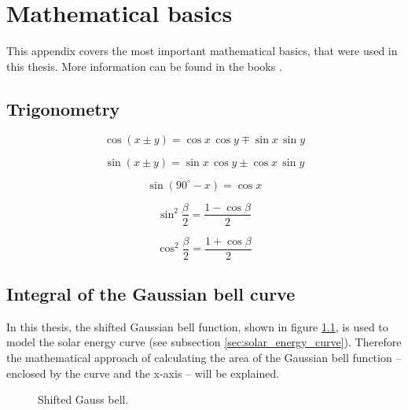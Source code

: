 \chapter{Mathematical basics}
This appendix covers the most important mathematical basics, that were used in this thesis. More information can be found in the books \cite{Durandi:2009, Schwarz:2011, Rudolf:2014, Taschner:2014, Taschner:2015, Kugi:2021}.

\section{Trigonometry} \label{sec:trigonometry}

\begin{center}
	\begin{equation} \label{eq:addition_theorem_cos}
		\cos \left(x \pm y\right) = \cos x \, \cos y \mp \sin x \, \sin y
	\end{equation}
\end{center}

\begin{center}
	\begin{equation} \label{eq:addition_theorem_sin}
		\sin \left(x \pm y\right) = \sin x \, \cos y \pm \cos x \, \sin y
	\end{equation}
\end{center}

\begin{center}
	\begin{equation} \label{eq:reduction_formula}
		\sin \left(90^\circ - x \right) = \cos x
	\end{equation}
\end{center}

\begin{center}
	\begin{equation} \label{eq:sin_squared}
		\sin^2 \frac{\beta}{2} = \frac{1 - \cos \beta}{2}
	\end{equation}
\end{center}

\begin{center}
	\begin{equation} \label{eq:cos_squared}
		\cos^2 \frac{\beta}{2} = \frac{1 + \cos \beta}{2}
	\end{equation}
\end{center}


\section{Integral of the Gaussian bell curve} \label{sec:gauss_general}
In this thesis, the shifted Gaussian bell function, shown in figure \ref{fig:tikz_gauss_curve_general}, is used to model the solar energy curve (see subsection \ref{sec:solar_energy_curve}). Therefore the mathematical approach of calculating the area of the Gaussian bell function -- enclosed by the curve and the x-axis -- will be explained.
\begin{figure}[h!]
	\centering
	
	\caption{Shifted Gauss bell.}
	\label{fig:tikz_gauss_curve_general}
\end{figure}

